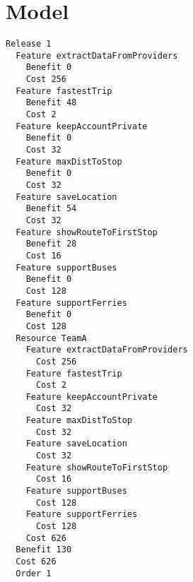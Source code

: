 \chapter{Model}


\begin{lstlisting}
Release 1
  Feature extractDataFromProviders
    Benefit 0
    Cost 256
  Feature fastestTrip
    Benefit 48
    Cost 2
  Feature keepAccountPrivate
    Benefit 0
    Cost 32
  Feature maxDistToStop
    Benefit 0
    Cost 32
  Feature saveLocation
    Benefit 54
    Cost 32
  Feature showRouteToFirstStop
    Benefit 28
    Cost 16
  Feature supportBuses
    Benefit 0
    Cost 128
  Feature supportFerries
    Benefit 0
    Cost 128
  Resource TeamA
    Feature extractDataFromProviders
      Cost 256
    Feature fastestTrip
      Cost 2
    Feature keepAccountPrivate
      Cost 32
    Feature maxDistToStop
      Cost 32
    Feature saveLocation
      Cost 32
    Feature showRouteToFirstStop
      Cost 16
    Feature supportBuses
      Cost 128
    Feature supportFerries
      Cost 128
    Cost 626
  Benefit 130
  Cost 626
  Order 1

\end{lstlisting}